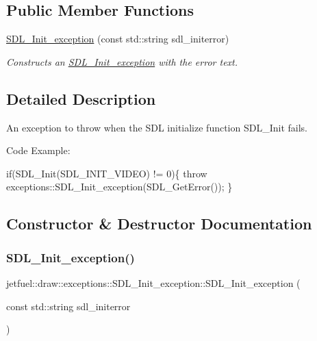 \subsection*{Public Member Functions}
\begin{DoxyCompactItemize}
\item 
\hyperlink{classjetfuel_1_1draw_1_1exceptions_1_1SDL__Init__exception_a7af9e4d40d575a1bec7b79407e2f7cce}{S\+D\+L\+\_\+\+Init\+\_\+exception} (const std\+::string sdl\+\_\+initerror)
\begin{DoxyCompactList}\small\item\em Constructs an \hyperlink{classjetfuel_1_1draw_1_1exceptions_1_1SDL__Init__exception}{S\+D\+L\+\_\+\+Init\+\_\+exception} with the error text. \end{DoxyCompactList}\end{DoxyCompactItemize}


\subsection{Detailed Description}
An exception to throw when the S\+DL initialize function S\+D\+L\+\_\+\+Init fails.

Code Example\+: 
\begin{DoxyCode}
\textcolor{keywordflow}{if}(SDL\_Init(SDL\_INIT\_VIDEO) != 0)\{
    \textcolor{keywordflow}{throw} exceptions::SDL\_Init\_exception(SDL\_GetError());
\}
\end{DoxyCode}
 

\subsection{Constructor \& Destructor Documentation}
\mbox{\label{classjetfuel_1_1draw_1_1exceptions_1_1SDL__Init__exception_a7af9e4d40d575a1bec7b79407e2f7cce}} 
\subsubsection{\texorpdfstring{S\+D\+L\+\_\+\+Init\+\_\+exception()}{SDL\_Init\_exception()}}
{\footnotesize\ttfamily jetfuel\+::draw\+::exceptions\+::\+S\+D\+L\+\_\+\+Init\+\_\+exception\+::\+S\+D\+L\+\_\+\+Init\+\_\+exception (\begin{DoxyParamCaption}\item[{const std\+::string}]{sdl\+\_\+initerror }\end{DoxyParamCaption})\hspace{0.3cm}{\ttfamily [inline]}}



